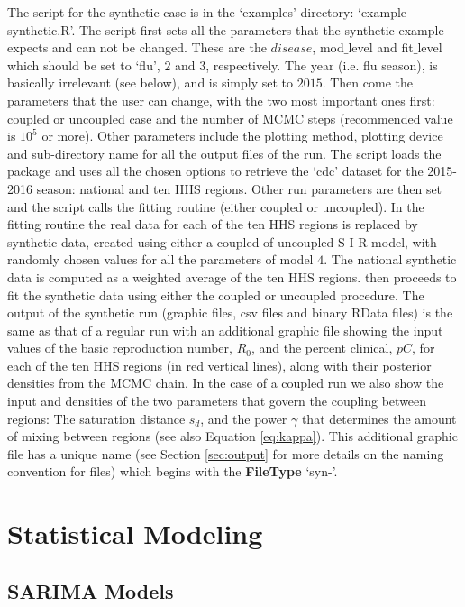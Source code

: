 \documentclass[a4paper]{article}
\begin{document}
The script for the synthetic case is in the  `examples' directory: `example-synthetic.R'.  The script first sets all the parameters that the synthetic example expects and can not be changed. These are the $disease$, mod$\_$level and fit$\_$level which should be set to `flu', $2$ and $3$, respectively.  The year (i.e. flu season), is basically irrelevant (see below), and is simply set to $2015$. Then come the parameters that the user can change, with the two most important ones first:  coupled or uncoupled case and the number of MCMC steps (recommended value is $10^5$ or more). Other parameters include the plotting method, plotting device and sub-directory name for all the output files of the run.  The script loads the  package and uses all the chosen options to retrieve the `cdc' dataset for the 2015-2016 season: national and ten HHS regions.  Other run parameters are then set and the script calls the fitting routine (either coupled or uncoupled). In the fitting routine the real data for each of the ten HHS regions is replaced by synthetic data, created using either a coupled of uncoupled S-I-R model, with randomly chosen values for all the parameters of model $4$.  The national synthetic data is computed as a weighted average of the ten HHS regions.  then proceeds to fit the synthetic data using either the coupled or uncoupled procedure.   The output of the synthetic run (graphic files, csv files and binary RData files) is the same as that of a regular run with an additional graphic file showing the input values of the basic reproduction number, $R_0$, and the percent clinical, $pC$, for each of the ten HHS regions (in red vertical lines), along with their posterior densities from the MCMC chain. In the case of a coupled run we also show the input and densities of the two parameters that govern the coupling between regions: The saturation distance $s_d$, and the power $\gamma$ that determines the amount of mixing between regions (see also Equation \ref{eq:kappa}).  This additional graphic file has a unique name (see Section \ref{sec:output} for more details on the naming convention for files) which begins with the \textbf{FileType} `syn-'.


\section{Statistical Modeling}
\subsection{SARIMA Models}
\label{sec:sarima}
\end{document}
